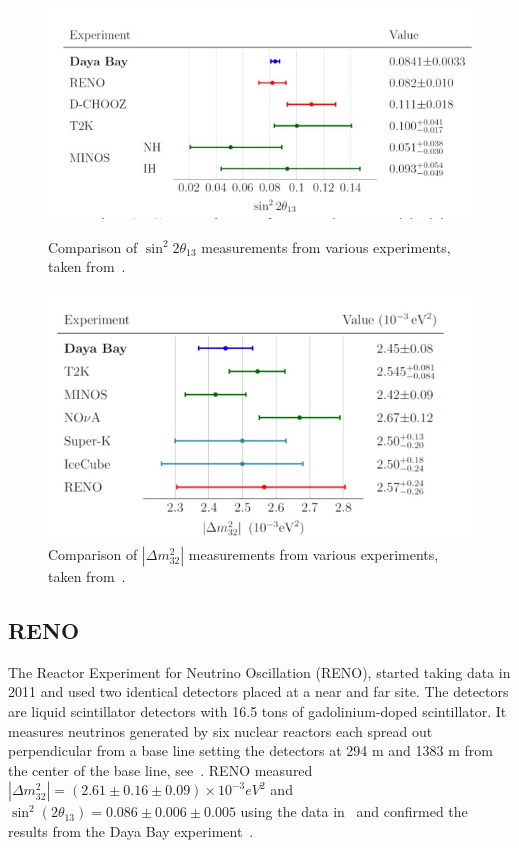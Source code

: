 \begin{figure}[h!]
  \centering
  \begin{minipage}[b]{0.49\textwidth}
    \includegraphics[width=\textwidth]{figures/db3.jpeg}
    \vspace{2mm}
    \caption{Comparison of $\sin^2 2\theta_{13}$ measurements from various experiments, taken from~\cite{122An}.}
    \label{fig:db3}
  \end{minipage}
  \hfill
  \begin{minipage}[b]{0.49\textwidth}
    \includegraphics[width=\textwidth]{figures/db4.jpeg}
       \vspace{2mm}
    \caption{Comparison of $|\Delta m^2_{32}|$ measurements from various experiments, taken from~\cite{122An}.}
     \label{fig:db4}
  \end{minipage}
\end{figure}

\subsection{RENO}
The Reactor Experiment for Neutrino Oscillation (RENO), started taking data in 2011 and used two identical detectors placed at a near and far site. The detectors are liquid scintillator detectors with 16.5 tons of gadolinium-doped scintillator. It measures neutrinos generated by six nuclear reactors each spread out perpendicular from a base line setting the detectors at 294 m and 1383 m from the center of the base line, see~. RENO measured $|\Delta m^2_{32}| = (2.61 \pm 0.16 \pm 0.09) \times 10^{-3} eV^2$ and $\sin^2(2\theta_{13}) = 0.086 \pm 0.006 \pm 0.005$ using the data in~ and confirmed the results from the Daya Bay experiment~\cite{125Ahn, 126RENO}.

